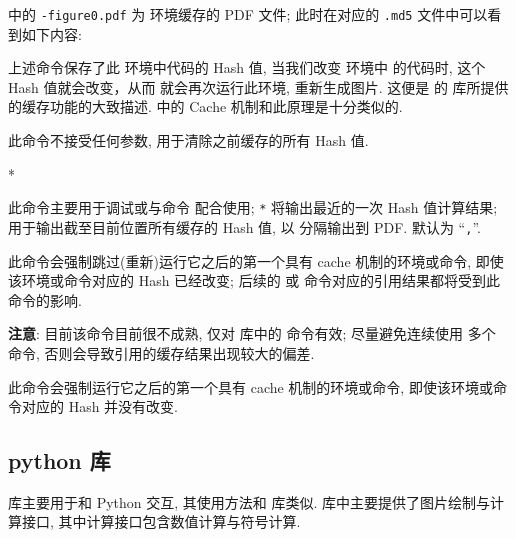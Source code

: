 \documentclass[
  hyper, lang=cn, 
  class=l3dox, 
]{../../zlatex/code/ztex}
\begin{document}
 中的 \texttt{-figure0.pdf} 为  环境缓存的 PDF 文件; 
此时在对应的 \texttt{.md5} 文件中可以看到如下内容:


\begin{DocExample}
\def \tikzexternallastkey {AE7F2539E81C96848ADCCEE3994993D1}%
\end{DocExample}
\resetExampleUR


上述命令保存了此  环境中代码的 Hash 值, 当我们改变  环境中
的代码时, 这个 Hash 值就会改变，从而 \TikZ{} 就会再次运行此环境, 重新生成图片. 这便是 \TikZ{} 的
 库所提供的缓存功能的大致描述. \zTikZ{} 中的 Cache 机制和此原理是十分类似的.


\begin{function}[added=2025-05-15]{\ztikzHashClean}
  此命令不接受任何参数, 用于清除之前缓存的所有 Hash 值.
\end{function}


\begin{function}[added=2025-05-15]{\ztikzHashCurrent}
  \begin{syntax}
    *
  \end{syntax}
  此命令主要用于调试或与命令  配合使用; \texttt{*} 将输出最近的一次 Hash 值计算结果;
   用于输出截至目前位置所有缓存的 Hash 值, 以  分隔输出到 PDF.
   默认为 ``\texttt{,}''.
\end{function}


\begin{function}[added=2025-05-15]{\ztikzForceToSkip}
  此命令会强制跳过(重新)运行它之后的第一个具有 cache 机制的环境或命令, 即使该环境或命令对应的 Hash 已经改变; 
  后续的  或  命令对应的引用结果都将受到此命令的影响. \par 
  \textbf{注意}: 目前该命令目前很不成熟, 仅对  库中的  命令有效; 尽量避免连续使用
  多个  命令, 否则会导致引用的缓存结果出现较大的偏差.
\end{function}


\begin{function}[added=2025-05-21]{\ztikzForceToRun}
  此命令会强制运行它之后的第一个具有 cache 机制的环境或命令, 即使该环境或命令对应的 Hash 并没有改变.
\end{function}


\clearpage
\subsection{python 库}
 库主要用于和 Python 交互, 其使用方法和  库类似.  
库中主要提供了图片绘制与计算接口, 其中计算接口包含数值计算与符号计算.
\end{document}
